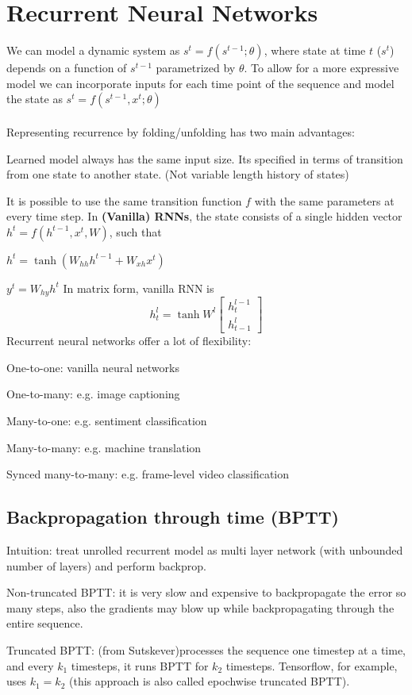 \documentclass[12pt]{article}
\begin{document}
\section{Recurrent Neural Networks}
We can model a dynamic system as $s^t = f(s^{t-1};\theta)$, where state at time $t$ ($s^t$) depends on a function of $s^{t-1}$ parametrized by $\theta$. To allow for a more expressive model we can incorporate inputs for each time point of the sequence and model the state as $s^t = f(s^{t-1}, x^t ;\theta)$
\\\\
Representing recurrence by folding/unfolding has two main advantages:
\ulb
\item Learned model always has the same input size. Its specified in terms of transition from one state to another state. (Not variable length history of states)
\item It is possible to use the same transition function $f$ with the same parameters at every time step.
\ule
In \textbf{(Vanilla) RNNs}, the state consists of a single hidden vector $h^t = f(h^{t-1}, x^t, W)$, such that
\ulb
\item $h^t = \tanh(W_{hh}h^{t-1} + W_{xh}x^t)$
\item $y^t = W_{hy}h^t$
\ule
\mce
In matrix form, vanilla RNN is
\[ h_t^l = \tanh W^l \begin{bmatrix} h_t^{l-1}\\h_{t-1}^l \end{bmatrix} \]
Recurrent neural networks offer a lot of flexibility:
\ulb
\item One-to-one: vanilla neural networks
\item One-to-many: e.g. image captioning
\item Many-to-one: e.g. sentiment classification
\item Many-to-many: e.g. machine translation
\item Synced many-to-many: e.g. frame-level video classification
\ule

\subsection{Backpropagation through time (BPTT)}
\par Intuition: treat unrolled recurrent model as multi layer network (with unbounded number of layers) and perform backprop.
\par Non-truncated BPTT: it is very slow and expensive to backpropagate the error so many steps, also the gradients may blow up while backpropagating through the entire sequence.
\par Truncated BPTT: (from Sutskever)processes the sequence one timestep at a time, and every $k_1$ timesteps, it runs BPTT for $k_2$ timesteps. Tensorflow, for example, uses $k_1 = k_2$ (this approach is also called epochwise truncated BPTT).
\end{document}
